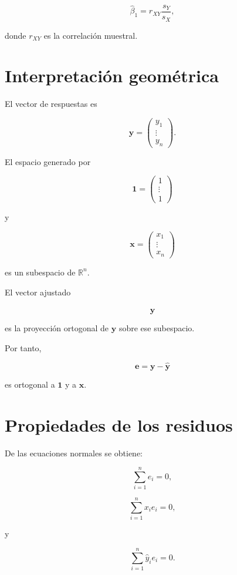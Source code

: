 \documentclass[
  spanish,
  11pt,
  letterpaper,
  DIV=11,
  numbers=noendperiod]{scrreprt}
\theoremstyle{definition}
\theoremstyle{plain}
\theoremstyle{definition}
\theoremstyle{remark}
\begin{document}
\[
\widehat{\beta}_1
=
r_{XY}
\frac{s_Y}{s_X},
\]

donde \(r_{XY}\) es la correlación muestral.

\section{Interpretación
geométrica}\label{interpretaciuxf3n-geomuxe9trica-1}

El vector de respuestas es

\[
\mathbf{y}
=
\begin{pmatrix}
y_1\\
\vdots\\
y_n
\end{pmatrix}.
\]

El espacio generado por

\[
\mathbf{1}
=
\begin{pmatrix}
1\\
\vdots\\
1
\end{pmatrix}
\]

y

\[
\mathbf{x}
=
\begin{pmatrix}
x_1\\
\vdots\\
x_n
\end{pmatrix}
\]

es un subespacio de \(\mathbb{R}^{n}\).

El vector ajustado

\[
\widehat{\mathbf{y}}
\]

es la proyección ortogonal de \(\mathbf{y}\) sobre ese subespacio.

Por tanto,

\[
\mathbf{e}
=
\mathbf{y}
-
\widehat{\mathbf{y}}
\]

es ortogonal a \(\mathbf{1}\) y a \(\mathbf{x}\).

\section{Propiedades de los residuos}\label{propiedades-de-los-residuos}

De las ecuaciones normales se obtiene:

\[
\sum_{i=1}^{n}e_i=0,
\]

\[
\sum_{i=1}^{n}x_ie_i=0,
\]

y

\[
\sum_{i=1}^{n}\widehat{y}_ie_i=0.
\]
\end{document}
